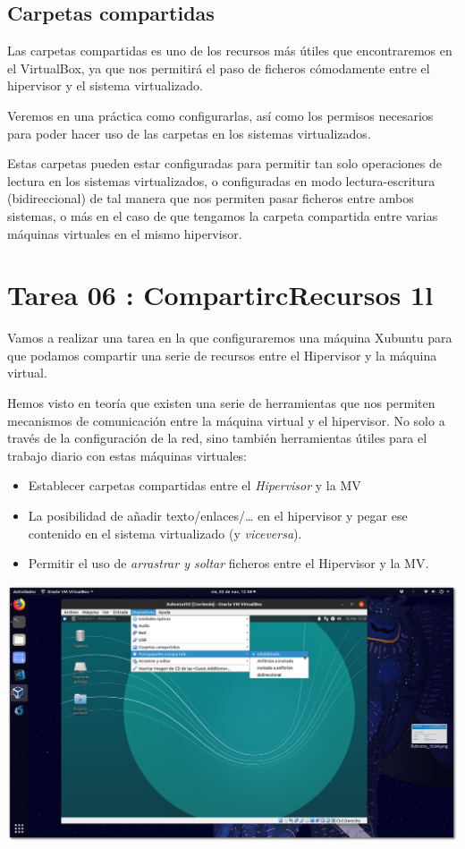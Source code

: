 \documentclass[11pt]{article}
\begin{document}
\subsection{Carpetas compartidas}
\label{sec:org89a7185}
Las carpetas compartidas es uno de los recursos más útiles que
encontraremos en el VirtualBox, ya que nos permitirá el paso de ficheros
cómodamente entre el hipervisor y el sistema virtualizado.

Veremos en una práctica como configurarlas, así como los permisos
necesarios para poder hacer uso de las carpetas en los sistemas
virtualizados.

Estas carpetas pueden estar configuradas para permitir tan solo
operaciones de lectura en los sistemas virtualizados, o configuradas en
modo lectura-escritura (bidireccional) de tal manera que nos permiten
pasar ficheros entre ambos sistemas, o más en el caso de que tengamos la
carpeta compartida entre varias máquinas virtuales en el mismo
hipervisor.


\newpage


\section{Tarea 06 : CompartircRecursos 1l}
\label{sec:org482a01e}
Vamos a realizar una tarea en la que configuraremos una máquina Xubuntu
para que podamos compartir una serie de recursos entre el Hipervisor y
la máquina virtual.

Hemos visto en teoría que existen una serie de herramientas que nos
permiten mecanismos de comunicación entre la máquina virtual y el
hipervisor. No solo a través de la configuración de la red, sino también
herramientas útiles para el trabajo diario con estas máquinas virtuales:

\begin{itemize}
\item Establecer carpetas compartidas entre el \emph{Hipervisor} y la MV
\item La posibilidad de añadir texto/enlaces/\ldots{} en el hipervisor y pegar
ese contenido en el sistema virtualizado (y \emph{viceversa}).
\item Permitir el uso de \emph{arrastrar y soltar} ficheros entre el Hipervisor y
la MV.
\end{itemize}

\begin{center}
\includegraphics[width=.9\linewidth]{imgs/VBox_GuestAdd_LinuX_007.png}
\end{center}
\end{document}
